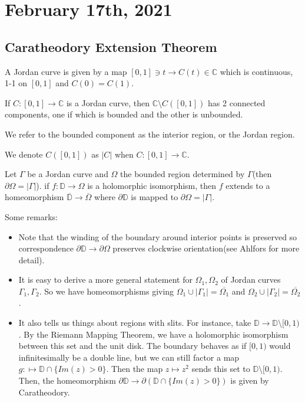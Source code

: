 \documentclass[12pt]{scrartcl}
\newcommand{\C}{\mathbb C}
\let \ol \overline
\begin{document}
\pagebreak
\section{February 17th, 2021}
\subsection{Caratheodory Extension Theorem}
\begin{definition} A Jordan curve is given by a map $[0, 1]\ni t \to C(t) \in \C$ which is continuous, 1-1 on $[0, 1]$ and $C(0) = C(1)$.  
\end{definition}
\begin{thm} If $C:[0, 1] \to \C$ is a Jordan curve, then $\C \setminus C([0, 1])$ has 2 connected components, one if which is bounded and the other is unbounded.  
\end{thm}
We refer to the bounded component as the interior region, or the Jordan region.

We denote $C([0, 1])$ as $|C|$ when $C:[0, 1] \to \C$.

\begin{thm}[Caratheodory] Let $\Gamma$ be a Jordan curve and $\Omega$ the bounded region determined by $\Gamma$(then $\partial \Omega = |\Gamma|$).  if $f: \mathbb D \to \Omega$ is a holomorphic isomorphism, then $f$ extends to a homeomorphism $\ol{\mathbb D} \to \ol{\Omega}$ where $\partial \mathbb D$ is mapped to $\partial \Omega = |\Gamma|$.  
\end{thm}


Some remarks:  
\begin{itemize}
\item Note that the winding of the boundary around interior points is preserved so correspondence $\partial \mathbb D \to \partial \Omega$ preserves clockwise orientation(see Ahlfors for more detail).
\item It is easy to derive a more general statement for $\Omega_1, \Omega_2$ of Jordan curves $\Gamma_1, \Gamma_2$.  So we have homeomorphisms giving $\Omega_1 \cup |\Gamma_1| = \ol{\Omega_1}$ and $\Omega_2 \cup |\Gamma_2| = \ol{\Omega_2}$.  
\item It also tells us things about regions with slits.  For instance, take $\mathbb D \to \mathbb D \setminus [0, 1)$.  By the Riemann Mapping Theorem, we have a holomorphic isomorphism between this set and the unit disk.  The boundary behaves as if $[0, 1)$ would infinitesimally be a double line, but we can still factor a map $g: \mapsto \mathbb D \cap \{Im(z) > 0\}$.  Then the map $z \mapsto z^2$ sends this set to $\mathbb D \setminus [0, 1)$.  Then, the homeomorphism $\partial \mathbb D \to \partial(\mathbb D \cap \{Im(z) > 0\})$ is given by Caratheodory.
\end{itemize}
\end{document}
